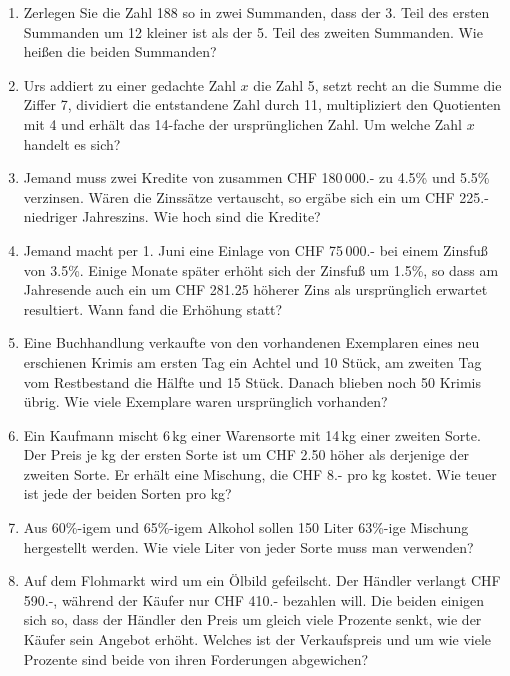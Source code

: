 \begin{enumerate}
\item
  Zerlegen Sie die Zahl 188 so in zwei Summanden, dass der 3. Teil des
  ersten Summanden um 12 kleiner ist als der 5. Teil des zweiten
  Summanden. Wie heißen die beiden Summanden?

\item Urs addiert zu einer gedachte Zahl $x$ die Zahl 5, setzt recht
  an die Summe die Ziffer 7, dividiert die entstandene Zahl durch 11,
  multipliziert den Quotienten mit 4 und erhält das 14-fache der
  ursprünglichen Zahl. Um welche Zahl $x$ handelt es sich?

\item Jemand muss zwei Kredite von zusammen CHF 180\,000.- zu 4.5\%
  und 5.5\% verzinsen. Wären die Zinssätze vertauscht, so ergäbe sich
  ein um CHF 225.- niedriger Jahreszins. Wie hoch sind die Kredite?

\item Jemand macht per 1. Juni eine Einlage von CHF 75\,000.- bei
  einem Zinsfuß von 3.5\%. Einige Monate später erhöht sich der
  Zinsfuß um 1.5\%, so dass am Jahresende auch ein um CHF 281.25
  höherer Zins als ursprünglich erwartet resultiert. Wann fand die
  Erhöhung statt?

\item Eine Buchhandlung verkaufte von den vorhandenen Exemplaren eines
  neu erschienen Krimis am ersten Tag ein Achtel und 10 Stück, am
  zweiten Tag vom Restbestand die Hälfte und 15 Stück. Danach blieben
  noch 50 Krimis übrig. Wie viele Exemplare waren ursprünglich
  vorhanden?

\item Ein Kaufmann mischt 6\,kg einer Warensorte mit 14\,kg einer
  zweiten Sorte. Der Preis je kg der ersten Sorte ist um CHF 2.50
  höher als derjenige der zweiten Sorte. Er erhält eine Mischung, die
  CHF 8.- pro kg kostet. Wie teuer ist jede der beiden Sorten pro kg?

\item Aus 60\%-igem und 65\%-igem Alkohol sollen 150 Liter 63\%-ige
  Mischung hergestellt werden. Wie viele Liter von jeder Sorte muss
  man verwenden?

\item Auf dem Flohmarkt wird um ein Ölbild gefeilscht. Der Händler
  verlangt CHF 590.-, während der Käufer nur CHF 410.- bezahlen
  will. Die beiden einigen sich so, dass der Händler den Preis um
  gleich viele Prozente senkt, wie der Käufer sein Angebot
  erhöht. Welches ist der Verkaufspreis und um wie viele Prozente sind
  beide von ihren Forderungen abgewichen?


\end{enumerate}
